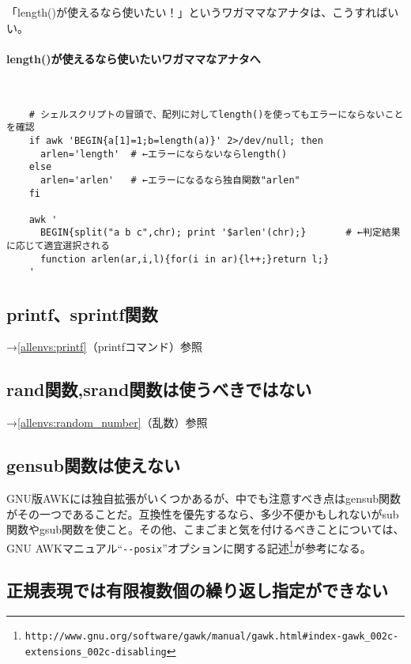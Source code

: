 「length()が使えるなら使いたい！」というワガママなアナタは、こうすればいい。

\paragraph{length()が使えるなら使いたいワガママなアナタへ} 　\\
\begin{frameboxit}{160.0mm}
\begin{verbatim}
	# シェルスクリプトの冒頭で、配列に対してlength()を使ってもエラーにならないことを確認
	if awk 'BEGIN{a[1]=1;b=length(a)}' 2>/dev/null; then
	  arlen='length'  # ←エラーにならないならlength()
	else
	  arlen='arlen'   # ←エラーになるなら独自関数"arlen"
	fi

	awk '
	  BEGIN{split("a b c",chr); print '$arlen'(chr);}       # ←判定結果に応じて適宜選択される
	  function arlen(ar,i,l){for(i in ar){l++;}return l;}
	'
\end{verbatim}
\end{frameboxit}

\subsection*{printf、sprintf関数}

\noindent
→\ref{allenvs:printf}（printfコマンド）参照

\subsection*{rand関数,srand関数は使うべきではない}

\noindent
→\ref{allenvs:random_number}（乱数）参照

\subsection*{gensub関数は使えない}

GNU版AWKには独自拡張がいくつかあるが、中でも注意すべき点はgensub関数がその一つであることだ。互換性を優先するなら、多少不便かもしれないがsub関数やgsub関数を使こと。その他、こまごまと気を付けるべきことについては、GNU AWKマニュアル``\verb|--posix|''オプションに関する記述\footnote{\verb|http://www.gnu.org/software/gawk/manual/gawk.html#index-gawk_002c-extensions_002c-disabling|}が参考になる。

\subsection*{正規表現では有限複数個の繰り返し指定ができない}

